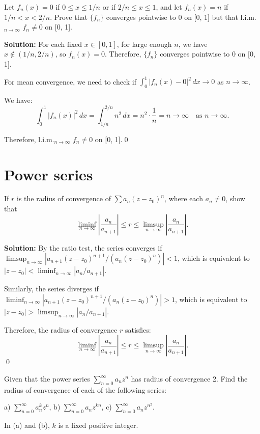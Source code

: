\begin{problembox}
Let \( f_n(x) = 0 \) if \( 0 \leq x \leq 1/n \) or if \( 2/n \leq x \leq 1 \), and let \( f_n(x) = n \) if \( 1/n < x < 2/n \). Prove that \( \{f_n\} \) converges pointwise to 0 on [0, 1] but that l.i.m.\(_{n\to\infty}\) \( f_n \neq 0 \) on [0, 1].
\end{problembox}

\bigskip\noindent\textbf{Solution:} For each fixed \( x \in [0, 1] \), for large enough \( n \), we have \( x \notin (1/n, 2/n) \), so \( f_n(x) = 0 \). Therefore, \( \{f_n\} \) converges pointwise to 0 on [0, 1].

For mean convergence, we need to check if \( \int_0^1 |f_n(x) - 0|^2 \, dx \to 0 \) as \( n \to \infty \).

We have:
\[\int_0^1 |f_n(x)|^2 \, dx = \int_{1/n}^{2/n} n^2 \, dx = n^2 \cdot \frac{1}{n} = n \to \infty \quad \text{as } n \to \infty.\]

Therefore, l.i.m.\(_{n\to\infty}\) \( f_n \neq 0 \) on [0, 1].\qed
\section{Power series}



\begin{problembox}
If \( r \) is the radius of convergence of \( \sum a_n(z - z_0)^n \), where each \( a_n \neq 0 \), show that
\[ \liminf_{n\to\infty} \left| \frac{a_n}{a_{n+1}} \right| \leq r \leq \limsup_{n\to\infty} \left| \frac{a_n}{a_{n+1}} \right|.\]
\end{problembox}

\bigskip\noindent\textbf{Solution:} By the ratio test, the series converges if \( \limsup_{n\to\infty} |a_{n+1}(z - z_0)^{n+1} / (a_n(z - z_0)^n)| < 1 \), which is equivalent to \( |z - z_0| < \liminf_{n\to\infty} |a_n/a_{n+1}| \).

Similarly, the series diverges if \( \liminf_{n\to\infty} |a_{n+1}(z - z_0)^{n+1} / (a_n(z - z_0)^n)| > 1 \), which is equivalent to \( |z - z_0| > \limsup_{n\to\infty} |a_n/a_{n+1}| \).

Therefore, the radius of convergence \( r \) satisfies:
\[\liminf_{n\to\infty} \left| \frac{a_n}{a_{n+1}} \right| \leq r \leq \limsup_{n\to\infty} \left| \frac{a_n}{a_{n+1}} \right|.\]\qed


\begin{problembox}
Given that the power series \( \sum_{n=0}^{\infty} a_nz^n \) has radius of convergence 2. Find the radius of convergence of each of the following series:

a) \( \sum_{n=0}^{\infty} a_n^k z^n \),    b) \( \sum_{n=0}^{\infty} a_nz^{kn} \),    c) \( \sum_{n=0}^{\infty} a_nz^{n^2} \).

In (a) and (b), \( k \) is a fixed positive integer.
\end{problembox}

